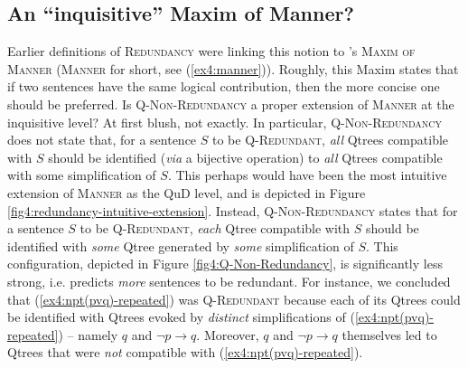 \subsection{An ``inquisitive'' Maxim of Manner?}
Earlier definitions of \textsc{Redundancy} were linking this notion to \citeauthor{Grice1975}'s \textsc{Maxim of Manner} (\textsc{Manner} for short, see (\ref{ex4:manner})). Roughly, this Maxim states that if two sentences have the same logical contribution, then the more concise one should be preferred. Is \textsc{Q-Non-Redundancy} a proper extension of \textsc{Manner} at the inquisitive level? At first blush, not exactly. In particular, \textsc{Q-Non-Redundancy} does not state that, for a sentence $S$ to be \textsc{Q-Redundant}, \textit{all} Qtrees compatible with $S$ should be identified (\textit{via} a bijective operation) to \textit{all} Qtrees compatible with some simplification of $S$. This perhaps would have been the most intuitive extension of \textsc{Manner} as the QuD level, and is depicted in Figure \ref{fig4:redundancy-intuitive-extension}. Instead, \textsc{Q-Non-Redundancy} states that for a sentence $S$ to be \textsc{Q-Redundant}, \textit{each} Qtree compatible with $S$ should be identified with \textit{some} Qtree generated by \textit{some} simplification of $S$. This configuration, depicted in Figure \ref{fig4:Q-Non-Redundancy}, is significantly less strong, i.e. predicts \textit{more} sentences to be redundant. For instance, we concluded that (\ref{ex4:npt(pvq)-repeated}) was \textsc{Q-Redundant} because each of its Qtrees could be identified with Qtrees evoked by \textit{distinct} simplifications of (\ref{ex4:npt(pvq)-repeated}) -- namely $q$ and $\neg p \rightarrow q$. Moreover, $q$ and $\neg p \rightarrow q$ themselves led to Qtrees that were \textit{not} compatible with (\ref{ex4:npt(pvq)-repeated}).

